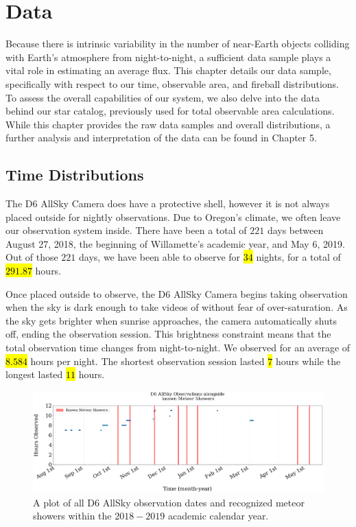 \chapter{Data}

Because there is intrinsic variability in the number of near-Earth objects colliding with Earth's atmosphere from night-to-night, a sufficient data sample plays a vital role in estimating an average flux.
This chapter details our data sample, specifically with respect to our time, observable area, and fireball distributions.  
To assess the overall capabilities of our system, we also delve into the data behind our star catalog, previously used for total observable area calculations.  
While this chapter provides the raw data samples and overall distributions, a further analysis and interpretation of the data can be found in Chapter 5.

\section{Time Distributions}

The D6 AllSky Camera does have a protective shell, however it is not always placed outside for nightly observations.
Due to Oregon's climate, we often leave our observation system inside.
There have been a total of $221$ days between August 27, 2018, the beginning of Willamette's academic year, and May 6, 2019.
Out of those $221$ days, we have been able to observe for \hl{$34$} nights, for a total of \hl{$291.87$} hours.

Once placed outside to observe, the D6 AllSky Camera begins taking observation when the sky is dark enough to take videos of without fear of over-saturation.
As the sky gets brighter when sunrise approaches, the camera automatically shuts off, ending the observation session.
This brightness constraint means that the total observation time changes from night-to-night.
We observed for an average of \hl{$8.584$} hours per night.
The shortest observation session lasted \hl{$7$} hours while the longest lasted \hl{$11$} hours.


\begin{figure}[ht!]
  \centering
  \includegraphics[scale=0.25]{images/nights_observed_with_meteorshowers.png}
  \caption{A plot of all D6 AllSky observation dates and recognized meteor showers within the $2018-2019$ academic calendar year.}
  \label{dateplot}
\end{figure}


